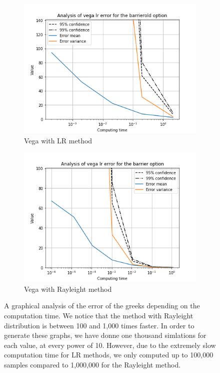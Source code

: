 \documentclass[11pt,a4paper,fleqn]{article}
\begin{document}
\begin{figure}[h!]
      \begin{subfigure}[b]{0.45\textwidth}
          \includegraphics[width=\textwidth]{graphs/barrieroldvegalrtime.png}
          \caption{Vega with LR method}
      \end{subfigure}
      \begin{subfigure}[b]{0.45\textwidth}
          \includegraphics[width=\textwidth]{graphs/barriervegalrtime.png}
          \caption{Vega with Rayleight method}
      \end{subfigure}

      \caption{\label{fig:barriergraphs}A graphical analysis of the error of the greeks depending on the computation time. We notice that the method with Rayleight distribution is between 100 and 1,000 times faster. In order to generate these graphs, we have donne one thousand simlations for each value, at every power of 10. However, due to the extremely slow computation time for LR methods, we only computed up to 100,000 samples compared to 1,000,000 for the Rayleight method.}
\end{figure}
\FloatBarrier
\end{document}
